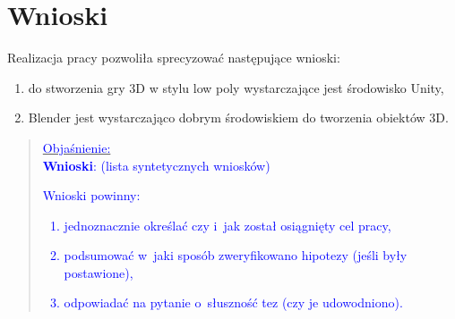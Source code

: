 \newpage
\chapter{Wnioski}
Realizacja pracy pozwoliła sprecyzować następujące wnioski:
\begin{enumerate}
  \item do stworzenia gry 3D w stylu low poly wystarczające jest środowisko Unity,
  \item Blender jest wystarczająco dobrym środowiskiem do tworzenia obiektów 3D.
\end{enumerate}



\begin{quote}
\scriptsize{
\underline{\textcolor{blue}{Objaśnienie:}}\\[1mm]
\textcolor{blue}{{\textbf{Wnioski}:} (lista syntetycznych wniosków)}\\[1mm]
\textcolor{blue}{
Wnioski powinny:
\begin{enumerate}
\item jednoznacznie określać czy i~jak został osiągnięty cel pracy,
\item podsumować w~jaki sposób zweryfikowano hipotezy (jeśli były postawione),
\item odpowiadać na pytanie o~słuszność tez (czy je udowodniono).
\end{enumerate}
}}
\end{quote} 
